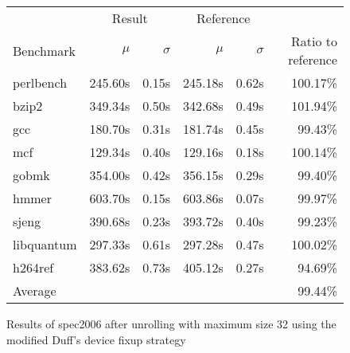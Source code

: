 \begin{figure}[bh]
    \begin{center}
        \begin{tabular}{lrrrrr}
            \toprule
            & \multicolumn{2}{c}{Result} & \multicolumn{2}{c}{Reference}\\
            Benchmark & $\mu$ & $\sigma$ & $\mu$ & $\sigma$ & Ratio to reference\\
            \midrule
            perlbench & 245.60s & 0.15s & 245.18s & 0.62s & 100.17\%\\
            bzip2 & 349.34s & 0.50s & 342.68s & 0.49s & 101.94\%\\
            gcc & 180.70s & 0.31s & 181.74s & 0.45s & 99.43\%\\
            mcf & 129.34s & 0.40s & 129.16s & 0.18s & 100.14\%\\
            gobmk & 354.00s & 0.42s & 356.15s & 0.29s & 99.40\%\\
            hmmer & 603.70s & 0.15s & 603.86s & 0.07s & 99.97\%\\
            sjeng & 390.68s & 0.23s & 393.72s & 0.40s & 99.23\%\\
            libquantum & 297.33s & 0.61s & 297.28s & 0.47s & 100.02\%\\
            h264ref & 383.62s & 0.73s & 405.12s & 0.27s & 94.69\%\\
            \midrule
            Average & & & & & 99.44\%\\
            \bottomrule
        \end{tabular}
    \end{center}
    \caption{Results of spec2006 after unrolling with maximum size 32 using the modified Duff's device fixup strategy}
    \label{fig:eval:perf:duff:32}
\end{figure}
